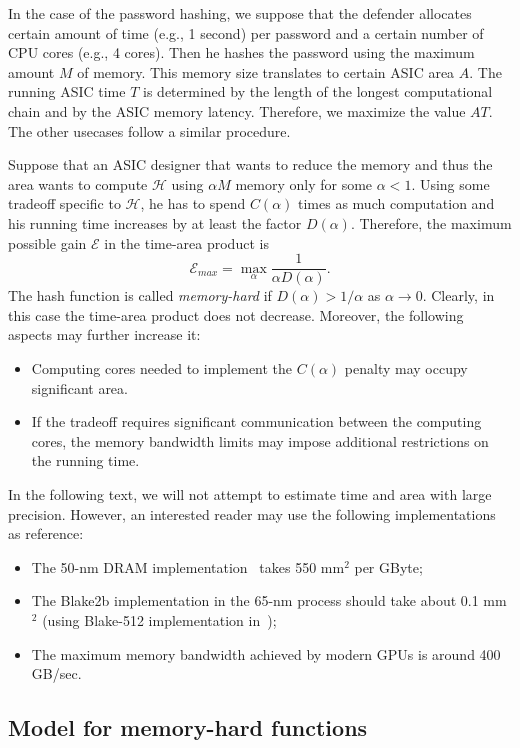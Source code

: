 \documentclass[a4paper]{article}
\begin{document}
In the case of the password hashing, we suppose that the defender allocates certain amount of time (e.g., 1 second) per password and a certain number of CPU cores (e.g., 4 cores). Then he hashes the password using the maximum amount $M$ of memory. This memory size translates to certain ASIC area $A$. The running ASIC time $T$ is determined by the length of the longest computational chain and by the ASIC memory latency.
Therefore, we maximize the value $AT$. The other usecases follow a similar procedure. 

Suppose that an ASIC designer that wants to reduce the memory and thus the area wants to compute $\mathcal{H}$ using $\alpha M$ memory only for some $\alpha<1$. Using some tradeoff specific to $\mathcal{H}$, he has to spend $C(\alpha)$ times as much computation and his running time increases by at least the factor $D(\alpha)$. Therefore, the maximum possible gain $\mathcal{E}$ in the time-area product is 
$$
\mathcal{E}_{max}= \max_{\alpha}\frac{1}{\alpha D(\alpha)}.
$$
The hash function is called \emph{memory-hard} if $D(\alpha) >1/\alpha$ as $\alpha\rightarrow 0$. Clearly, in this case the time-area product does not decrease. Moreover, the following aspects may further increase it:
\begin{itemize}
\item Computing cores needed to implement the $C(\alpha)$ penalty may occupy significant area.
\item If the tradeoff requires significant communication between the computing cores, the memory bandwidth limits may impose additional restrictions on the running time.
\end{itemize}

In the following text, we will not attempt to  estimate  time and area with large precision. However, an interested reader may use the following implementations as reference:
 \begin{itemize}
   \item The 50-nm DRAM implementation~\cite{giridhar2013dram} takes 550 mm${}^2$ per GByte;
   \item The Blake2b implementation in the 65-nm process should take about 0.1 mm${}^2$ (using Blake-512 implementation in~\cite{gurkaynak2012sha3});
   \item The maximum memory bandwidth achieved by modern GPUs is around 400 GB/sec.
 \end{itemize}
 
 \subsection{Model for memory-hard functions}
 
\end{document}
